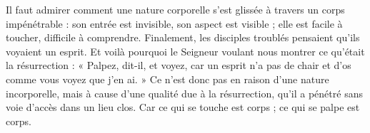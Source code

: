  Il faut admirer comment une nature corporelle s’est glissée à travers un corps impénétrable : son entrée est invisible, son aspect est visible ; elle est facile à toucher, difficile à comprendre. Finalement, les disciples troublés pensaient qu’ils voyaient un esprit. Et voilà pourquoi le Seigneur voulant nous montrer ce qu’était la résurrection : « Palpez, dit-il, et voyez, car un esprit n’a pas de chair et d’os comme vous voyez que j’en ai. » Ce n’est donc pas en raison d’une nature incorporelle, mais à cause d’une qualité due à la résurrection, qu’il a pénétré sans voie d’accès dans un lieu clos. Car ce qui se touche est corps ; ce qui se palpe est corps.